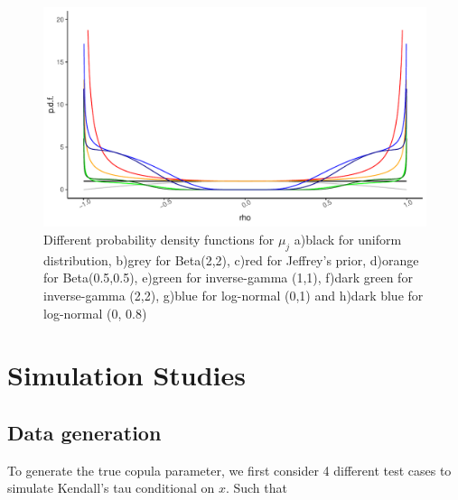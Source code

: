 \documentclass{amsart}
\begin{document}
\begin{figure}[ht]
	\centering
	\includegraphics[width=0.85\linewidth]{prior_comparison.pdf}
	\caption{Different probability density functions for $\mu_j$ a)black for uniform distribution,
	b)grey for Beta(2,2),
	c)red for Jeffrey's prior,
	d)orange for Beta(0.5,0.5),
	e)green for inverse-gamma (1,1),
	f)dark green for inverse-gamma (2,2),
	g)blue for log-normal (0,1) and
	h)dark blue for log-normal (0, 0.8)}
	\label{fig:sim-prior}
\end{figure}
\fi

\section{Simulation Studies}

\subsection{Data generation}

To generate the true copula parameter, we first consider 4 different test cases to simulate Kendall's tau conditional on $x$. Such that
 
\end{document}
